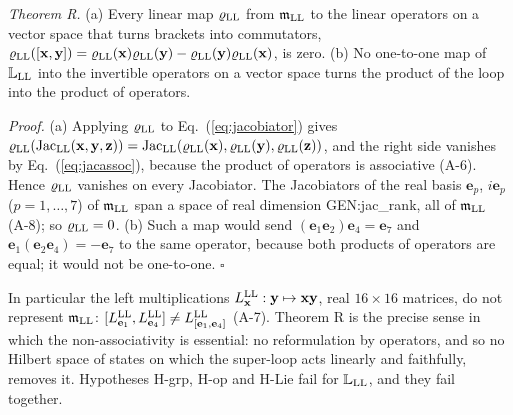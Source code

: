 \noindent\emph{Theorem R.} (a) Every linear map $\varrho_{\rm LL}$ from $\mathfrak m_{\rm LL}$ to the
linear operators on a vector space that turns brackets into commutators,
$\varrho_{\rm LL}([\mathbf x,\mathbf y])=\varrho_{\rm LL}(\mathbf x)\varrho_{\rm LL}(\mathbf
y)-\varrho_{\rm LL}(\mathbf y)\varrho_{\rm LL}(\mathbf x)$, is zero. (b) No one-to-one map of
$\mathbb L_{\rm LL}$ into the invertible operators on a vector space turns the product of the loop into
the product of operators.

\noindent\emph{Proof.} (a) Applying $\varrho_{\rm LL}$ to Eq.~(\ref{eq:jacobiator}) gives
$\varrho_{\rm LL}(\mathrm{Jac}_{\rm LL}(\mathbf x,\mathbf y,\mathbf z))=\mathrm{Jac}_{\rm
LL}(\varrho_{\rm LL}(\mathbf x),\varrho_{\rm LL}(\mathbf y),\varrho_{\rm LL}(\mathbf z))$, and the right
side vanishes by Eq.~(\ref{eq:jacassoc}), because the product of operators is associative (A-6). Hence
$\varrho_{\rm LL}$ vanishes on every Jacobiator. The Jacobiators of the real basis $\mathbf e_p$,
$i\mathbf e_p$ ($p=1,\dots,7$) of $\mathfrak m_{\rm LL}$ span a space of real dimension
{{GEN:jac_rank}}, all of $\mathfrak m_{\rm LL}$ (A-8); so $\varrho_{\rm LL}=0$. (b) Such a map would
send $(\mathbf e_1\mathbf e_2)\mathbf e_4=\mathbf e_7$ and $\mathbf e_1(\mathbf e_2\mathbf e_4)=-\mathbf
e_7$ to the same operator, because both products of operators are equal; it would not be one-to-one.
$\square$

In particular the left multiplications $L^{\rm LL}_{\mathbf x}:\mathbf y\mapsto\mathbf x\mathbf y$, real
$16\times16$ matrices, do not represent $\mathfrak m_{\rm LL}$: $[L^{\rm LL}_{\mathbf e_1},L^{\rm
LL}_{\mathbf e_4}]\neq L^{\rm LL}_{[\mathbf e_1,\mathbf e_4]}$ (A-7). Theorem R is the precise sense in
which the non-associativity is essential: no reformulation by operators, and so no Hilbert space of
states on which the super-loop acts linearly and faithfully, removes it. Hypotheses H-grp, H-op and
H-Lie fail for $\mathbb L_{\rm LL}$, and they fail together.
